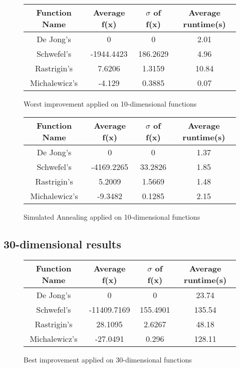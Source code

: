 \documentclass{article}
\begin{document}
\begin{figure}[H]
\begin{tabular}{|c||c|c|c|} \hline
	Function Name & Average f(x) & $\sigma$ of f(x) & Average runtime(s) \\ \hline \hline
	De Jong's & 0 & 0 & 2.01 \\ \hline
	Schwefel's & -1944.4423 & 186.2629 & 4.96 \\ \hline
	Rastrigin's & 7.6206 & 1.3159 & 10.84 \\ \hline
	Michalewicz's & -4.129 & 0.3885 & 0.07 \\ \hline
\end{tabular}
\caption{Worst improvement applied on 10-dimensional functions}
\end{figure}

\begin{figure}[H]
\begin{tabular}{|c||c|c|c|} \hline
	Function Name & Average f(x) & $\sigma$ of f(x) & Average runtime(s) \\ \hline \hline
	De Jong's & 0 & 0 & 1.37 \\ \hline
	Schwefel's & -4169.2265 & 33.2826 & 1.85 \\ \hline
	Rastrigin's & 5.2009 & 1.5669 & 1.48 \\ \hline
	Michalewicz's & -9.3482 & 0.1285 & 2.15 \\ \hline
\end{tabular}
\caption{Simulated Annealing applied on 10-dimensional functions}
\end{figure}

\subsection{30-dimensional results}

\begin{figure}[H]
\begin{tabular}{|c||c|c|c|} \hline
	Function Name & Average f(x) & $\sigma$ of f(x) & Average runtime(s) \\ \hline \hline
	De Jong's & 0 & 0 & 23.74 \\ \hline
	Schwefel's & -11409.7169 & 155.4901 & 135.54 \\ \hline
	Rastrigin's & 28.1095 & 2.6267 & 48.18 \\ \hline
	Michalewicz's & -27.0491 & 0.296 & 128.11 \\ \hline
\end{tabular}
\caption{Best improvement applied on 30-dimensional functions}
\end{figure}
\end{document}
